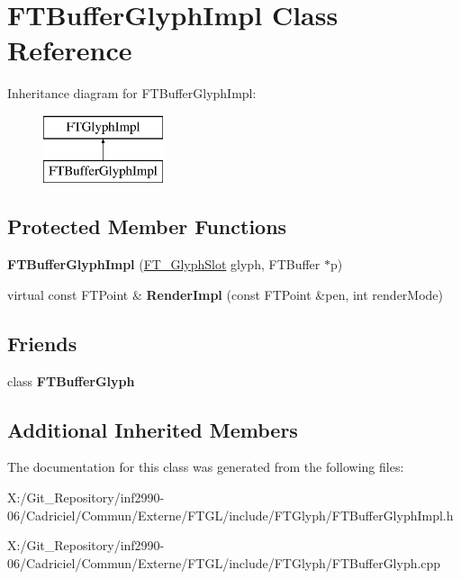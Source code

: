 \hypertarget{class_f_t_buffer_glyph_impl}{\section{F\-T\-Buffer\-Glyph\-Impl Class Reference}
\label{class_f_t_buffer_glyph_impl}
}
Inheritance diagram for F\-T\-Buffer\-Glyph\-Impl\-:\begin{figure}[H]
\begin{center}
\leavevmode
\includegraphics[height=2.000000cm]{class_f_t_buffer_glyph_impl}
\end{center}
\end{figure}
\subsection*{Protected Member Functions}
\begin{DoxyCompactItemize}
\item 
\hypertarget{class_f_t_buffer_glyph_impl_a02a187494995d95792ef66767f04c56d}{{\bfseries F\-T\-Buffer\-Glyph\-Impl} (\hyperlink{struct_f_t___glyph_slot_rec__}{F\-T\-\_\-\-Glyph\-Slot} glyph, F\-T\-Buffer $\ast$p)}\label{class_f_t_buffer_glyph_impl_a02a187494995d95792ef66767f04c56d}

\item 
\hypertarget{class_f_t_buffer_glyph_impl_a4f7f56caf34309cf7e1408a631b419de}{virtual const F\-T\-Point \& {\bfseries Render\-Impl} (const F\-T\-Point \&pen, int render\-Mode)}\label{class_f_t_buffer_glyph_impl_a4f7f56caf34309cf7e1408a631b419de}

\end{DoxyCompactItemize}
\subsection*{Friends}
\begin{DoxyCompactItemize}
\item 
\hypertarget{class_f_t_buffer_glyph_impl_a385e2288042fd77f037a715e7801b451}{class {\bfseries F\-T\-Buffer\-Glyph}}\label{class_f_t_buffer_glyph_impl_a385e2288042fd77f037a715e7801b451}

\end{DoxyCompactItemize}
\subsection*{Additional Inherited Members}


The documentation for this class was generated from the following files\-:\begin{DoxyCompactItemize}
\item 
X\-:/\-Git\-\_\-\-Repository/inf2990-\/06/\-Cadriciel/\-Commun/\-Externe/\-F\-T\-G\-L/include/\-F\-T\-Glyph/F\-T\-Buffer\-Glyph\-Impl.\-h\item 
X\-:/\-Git\-\_\-\-Repository/inf2990-\/06/\-Cadriciel/\-Commun/\-Externe/\-F\-T\-G\-L/include/\-F\-T\-Glyph/F\-T\-Buffer\-Glyph.\-cpp\end{DoxyCompactItemize}
